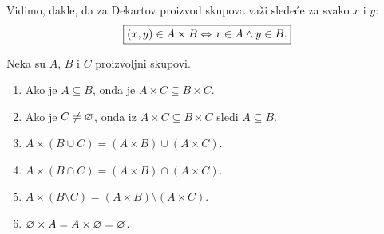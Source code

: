 \noindent
Vidimo, dakle, da za Dekartov proizvod skupova va\v zi slede\'ce za svako $x$ i $y$:
$$
  \fbox{$(x, y) \in A \times B \Leftrightarrow x \in A \land y \in B.$}
$$

\begin{THM}
  Neka su $A$, $B$ i $C$ proizvoljni skupovi.
  \begin{enumerate}
  \item
    Ako je $A \subseteq B$, onda je $A \times C \subseteq B \times C$.
  \item
    Ako je $C \ne \varnothing$, onda iz $A \times C \subseteq B \times C$ sledi $A \subseteq B$.
  \item
    $A \times (B \cup C) = (A \times B) \cup (A \times C)$.
  \item
    $A \times (B \cap C) = (A \times B) \cap (A \times C)$.
  \item
    $A \times (B \setminus C) = (A \times B) \setminus (A \times C)$.
  \item
    $\varnothing \times A = A \times \varnothing = \varnothing$.
  \end{enumerate}
\end{THM}
